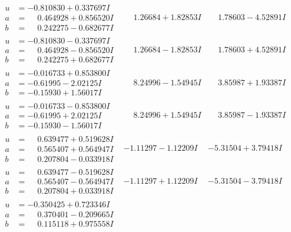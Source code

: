 \documentclass[1p]{elsarticle_modified}
\theoremstyle{definition}
\begin{document}
$$\begin{array}{c|c|c}
\begin{aligned}
u &= -0.810830 + 0.337697 I \\
a &= \phantom{-}0.464928 + 0.856520 I \\
b &= \phantom{-}0.242275 - 0.682677 I\end{aligned}
 & \phantom{-}1.26684 + 1.82853 I & \phantom{-}1.78603 - 4.52891 I \\ \hline\begin{aligned}
u &= -0.810830 - 0.337697 I \\
a &= \phantom{-}0.464928 - 0.856520 I \\
b &= \phantom{-}0.242275 + 0.682677 I\end{aligned}
 & \phantom{-}1.26684 - 1.82853 I & \phantom{-}1.78603 + 4.52891 I \\ \hline\begin{aligned}
u &= -0.016733 + 0.853800 I \\
a &= -0.61995 - 2.02125 I \\
b &= -0.15930 + 1.56017 I\end{aligned}
 & \phantom{-}8.24996 - 1.54945 I & \phantom{-}3.85987 + 1.93387 I \\ \hline\begin{aligned}
u &= -0.016733 - 0.853800 I \\
a &= -0.61995 + 2.02125 I \\
b &= -0.15930 - 1.56017 I\end{aligned}
 & \phantom{-}8.24996 + 1.54945 I & \phantom{-}3.85987 - 1.93387 I \\ \hline\begin{aligned}
u &= \phantom{-}0.639477 + 0.519628 I \\
a &= \phantom{-}0.565407 + 0.564947 I \\
b &= \phantom{-}0.207804 - 0.033918 I\end{aligned}
 & -1.11297 - 1.12209 I & -5.31504 + 3.79418 I \\ \hline\begin{aligned}
u &= \phantom{-}0.639477 - 0.519628 I \\
a &= \phantom{-}0.565407 - 0.564947 I \\
b &= \phantom{-}0.207804 + 0.033918 I\end{aligned}
 & -1.11297 + 1.12209 I & -5.31504 - 3.79418 I \\ \hline\begin{aligned}
u &= -0.350425 + 0.723346 I \\
a &= \phantom{-}0.370401 - 0.209665 I \\
b &= \phantom{-}0.115118 + 0.975558 I\end{aligned}

\end{array}$$
\end{document}
